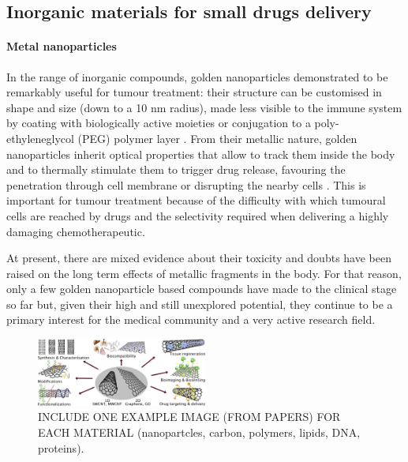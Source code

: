 \subsection{Inorganic materials for small drugs delivery}

\paragraph{Metal nanoparticles} In the range of inorganic compounds, golden nanoparticles demonstrated to be remarkably useful for tumour treatment: their structure can be customised in shape and size (down to a 10 nm radius), made less visible to the immune system by coating with biologically active moieties or conjugation to a poly-ethyleneglycol (PEG) polymer layer \cite{Singh2018}. From their metallic nature, golden nanoparticles inherit optical properties that allow to track them inside the body and to thermally stimulate them to trigger drug release, favouring the penetration through cell membrane or disrupting the nearby cells \cite{Boisselier2009}. This is important for tumour treatment because of the difficulty with which tumoural cells are reached by drugs and the selectivity required when delivering a highly damaging chemotherapeutic.

At present, there are mixed evidence about their toxicity \cite{Boisselier2009} and doubts have been raised on the long term effects of metallic fragments in the body. For that reason, only a few golden nanoparticle based compounds have made to the clinical stage so far \cite{Singh2018} but, given their high and still unexplored potential, they continue to be a primary interest for the medical community and a very active research field.

\begin{figure}
\begin{center}
\includegraphics[width = 0.5\textwidth]{pics/carbon_review.jpg}
\vspace{0.2cm}
\caption[Materials for drug delivery vehicles]{INCLUDE ONE EXAMPLE IMAGE (FROM PAPERS) FOR EACH MATERIAL (nanopartcles, carbon, polymers, lipids, DNA, proteins).} \label{fig:vehicles}
\end{center}
\end{figure}

